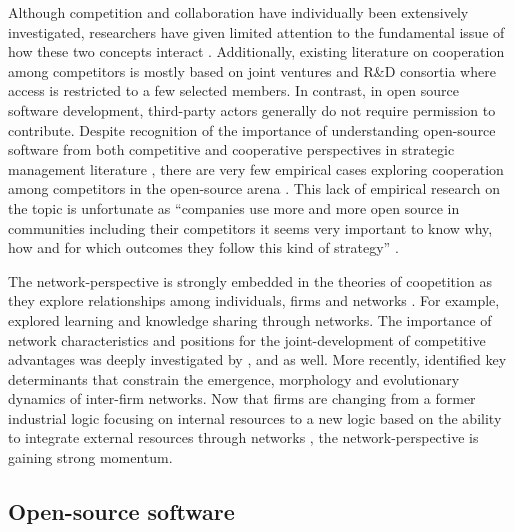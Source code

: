 \documentclass[CHICAGO,Times1COL]{WileyNJDv5} %
\begin{document}
Although competition and collaboration have individually been extensively investigated, researchers have given limited attention to the fundamental issue of how
these two
concepts interact \citep{ChenMehra_et_al2022}. Additionally, existing literature on cooperation among competitors is mostly based on
joint ventures and R\&D consortia where access is restricted to a few selected members\citep[e.g.,][]{LeeSaunders_et_al2021,GnyawaliFan_et_al2010}. In contrast, in open
source software development, third-party actors generally do
not require permission to contribute. Despite recognition of the importance of understanding open-source software from both competitive and cooperative perspectives in
strategic management literature \citep[see][]{ mcGaughey2002_on_intelectual_assets}, there are very few empirical cases exploring cooperation among
competitors in the open-source arena \citep[see][for a recent review]{teixeira2023icis}. This lack of empirical research on the topic is unfortunate as ``companies use more
and more open source in communities
including their competitors it seems very important to know why, how and for which outcomes they follow this kind of strategy'' \citep{CzakonSrivastava_et_al2020}.



 The network-perspective is strongly embedded in the theories of coopetition as they explore relationships among individuals, firms and networks
\citep{BengtssonKock2014}. For example, \citet{powell_interorganizational_1996} explored learning and knowledge sharing through networks. The importance of network
characteristics and positions for the joint-development of competitive advantages was deeply investigated by \citet{gnyawali_cooperative_2001},
\citet{shipilov2006network} and \citet{shipilov2008can} as well. More recently, \citet{dagnino2008evolutionary} identified key determinants that constrain the emergence,
morphology and evolutionary dynamics of inter-firm networks. Now that firms are changing from a former industrial logic focusing on internal resources to a new logic
based on the ability to integrate external resources through networks \citep{chesbrough_open_2003,henkel_selective_2006}, the network-perspective is gaining strong
momentum.




\subsection{Open-source software}
\end{document}
